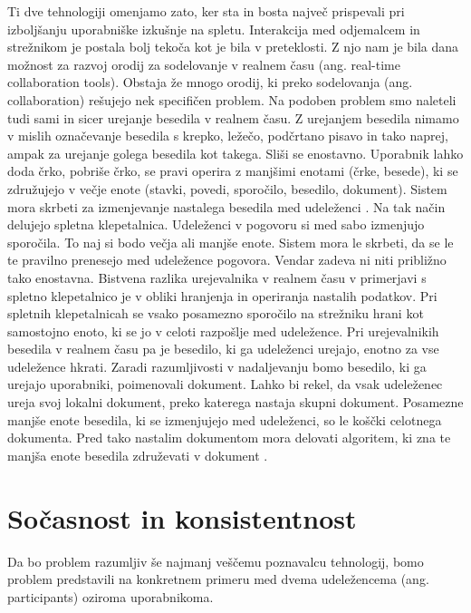 \documentclass[a4paper, 12pt, twoside]{book}
\begin{document}
Ti dve tehnologiji omenjamo zato, ker sta in bosta največ prispevali pri izboljšanju uporabniške izkušnje na spletu. Interakcija med odjemalcem in strežnikom je postala bolj tekoča kot je bila v preteklosti. Z njo nam je bila dana možnost za razvoj orodij za sodelovanje v realnem času (ang. real-time collaboration tools). Obstaja že mnogo orodij, ki preko sodelovanja (ang. collaboration) rešujejo nek specifičen problem. Na podoben problem smo naleteli tudi sami in sicer urejanje besedila v realnem času. Z urejanjem besedila nimamo v mislih označevanje besedila s krepko, ležečo, podčrtano pisavo in tako naprej, ampak za urejanje golega besedila kot takega. Sliši se enostavno. Uporabnik lahko doda črko, pobriše črko, se pravi operira z manjšimi enotami (črke, besede), ki se združujejo v večje enote (stavki, povedi, sporočilo, besedilo, dokument). Sistem mora skrbeti za izmenjevanje nastalega besedila med udeleženci \cite{gdocs23}. Na tak način delujejo spletna klepetalnica. Udeleženci v pogovoru si med sabo izmenjujo sporočila. To naj si bodo večja ali manjše enote. Sistem mora le skrbeti, da se le te pravilno prenesejo med udeležence pogovora. Vendar zadeva ni niti približno tako enostavna. Bistvena razlika urejevalnika v realnem času v primerjavi s spletno klepetalnico je v obliki hranjenja in operiranja nastalih podatkov. Pri spletnih klepetalnicah se vsako posamezno sporočilo na strežniku hrani kot samostojno enoto, ki se jo v celoti razpošlje med udeležence. Pri urejevalnikih besedila v realnem času pa je besedilo, ki ga udeleženci urejajo, enotno za vse udeležence hkrati. Zaradi razumljivosti v nadaljevanju bomo besedilo, ki ga urejajo uporabniki, poimenovali dokument. Lahko bi rekel, da vsak udeleženec ureja svoj lokalni dokument, preko katerega nastaja skupni dokument. Posamezne manjše enote besedila, ki se izmenjujejo med udeleženci, so le koščki celotnega dokumenta. Pred tako nastalim dokumentom mora delovati algoritem, ki zna te manjša enote besedila združevati v dokument \cite{gdocs22}.

\section{Sočasnost in konsistentnost}

Da bo problem razumljiv še najmanj veščemu poznavalcu tehnologij, bomo problem predstavili na konkretnem primeru \cite{problem} med dvema udeležencema (ang. participants) oziroma uporabnikoma.
\end{document}
